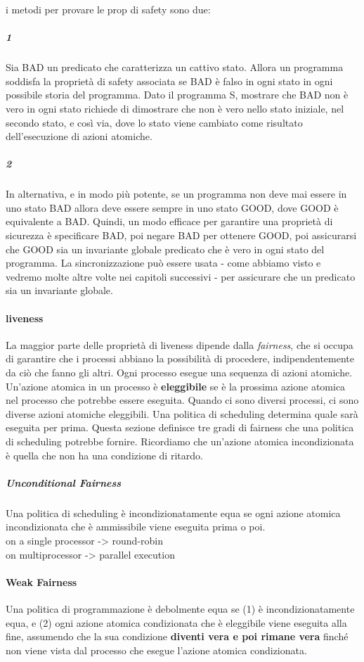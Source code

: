 \documentclass[10pt,a4paper]{book}
\begin{document}
i metodi per provare le prop di safety sono due:
\subparagraph{1} Sia BAD un predicato che caratterizza un cattivo stato. Allora un programma soddisfa la proprietà di safety associata se BAD è falso in ogni stato in ogni possibile storia del programma. Dato il programma S, mostrare che BAD non è vero in ogni stato richiede di dimostrare che non è vero nello
stato iniziale, nel secondo stato, e così via, dove lo stato viene cambiato come risultato dell'esecuzione di azioni atomiche.
\subparagraph{2} In alternativa, e in modo più potente, se un programma non deve mai essere in uno stato BAD allora deve essere sempre in uno stato GOOD, dove GOOD è equivalente a BAD. Quindi, un modo efficace per garantire una proprietà di sicurezza è specificare BAD, poi negare BAD per ottenere GOOD, poi assicurarsi che GOOD sia un invariante globale predicato che è vero in ogni stato del programma. La sincronizzazione può essere usata - come abbiamo visto e vedremo molte altre volte nei capitoli successivi - per assicurare che un predicato sia un invariante globale.

\paragraph{liveness}
La maggior parte delle proprietà di liveness dipende dalla \textit{fairness}, che si occupa di garantire che i processi abbiano la possibilità di procedere, indipendentemente da ciò che fanno gli altri. Ogni processo esegue una sequenza di azioni atomiche. Un'azione atomica in un processo è \textbf{eleggibile} se è la prossima azione atomica nel processo che potrebbe essere eseguita.
Quando ci sono diversi processi, ci sono diverse azioni atomiche eleggibili. Una politica di scheduling determina quale sarà eseguita per prima. Questa sezione definisce tre gradi di fairness che una politica di scheduling potrebbe fornire.
Ricordiamo che un'azione atomica incondizionata è quella che non ha una condizione di ritardo.

\subparagraph{Unconditional Fairness} Una politica di scheduling è incondizionatamente equa se
ogni azione atomica incondizionata che è ammissibile viene eseguita prima o poi.\\
on a single processor -> round-robin\\
on multiprocessor -> parallel execution

\paragraph{Weak Fairness} Una politica di programmazione è debolmente equa se (1) è incondizionatamente equa, e (2) ogni azione atomica condizionata che è eleggibile viene eseguita alla fine, assumendo che la sua condizione \textbf{diventi vera e poi rimane vera} finché non viene vista dal processo che esegue l'azione atomica condizionata.
\end{document}
